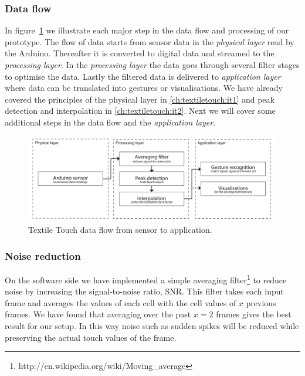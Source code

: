 \subsubsection{Data flow}
In figure~\ref{fig:textiletouch:dataflow} we illustrate each major step in the data flow and processing 
of our prototype.
The flow of data starts from sensor data in the \emph{physical layer} read by the Arduino.
Thereafter it is converted to digital data and streamed to the \emph{processing layer}.
In the \emph{processing layer} the data goes through several filter stages to optimise the data.
Lastly the filtered data is delivered to \emph{application layer} where data can be translated into gestures or visualisations.
We have already covered the principles of the physical layer in \ref{ch:textiletouch:it1} and peak detection and interpolation in \ref{ch:textiletouch:it2}.
Next we will cover some additional steps in the data flow and the \emph{application layer}.

\begin{figure}[b]
  \centering
      \includegraphics[width=\textwidth]{figures/touch/dataflow}
  \caption[The data flow from sensor to application.]
   {Textile Touch data flow from sensor to application.}
   \label{fig:textiletouch:dataflow}
\end{figure}

\subsubsection{Noise reduction}
On the software side we have implemented a simple averaging filter\footnote{http://en.wikipedia.org/wiki/Moving\_average} to reduce noise by increasing the signal-to-noise ratio, SNR.
This filter takes each input frame and averages the values of each cell with the cell values of \(x\) previous frames.
We have found that averaging over the past \(x = 2\) frames gives the best result for our setup. 
In this way noise such as sudden spikes will be reduced while preserving the actual touch values of the frame.

